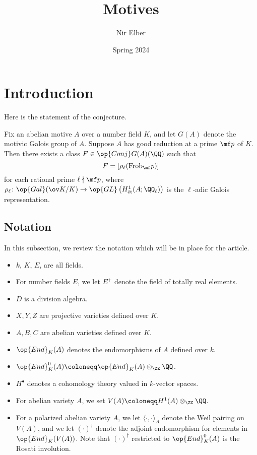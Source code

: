 \documentclass{article}
\title{Motives}
\author{Nir Elber}
\date{Spring 2024}
\begin{document}
\maketitle

\tableofcontents

\section{Introduction}
Here is the statement of the conjecture.
\begin{conj} \label{conj:desired-conjecture}
	Fix an abelian motive $A$ over a number field $K$, and let $G(A)$ denote the motivic Galois group of $A$. Suppose $A$ has good reduction at a prime $\mf p$ of $K$. Then there exists a class $F\in\op{Conj}G(A)(\QQ)$ such that
	\[F=[\rho_\ell(\mathrm{Frob}_\mf p)]\]
	for each rational prime $\ell\nmid\mf p$, where $\rho_\ell\colon\op{Gal}(\ov K/K)\to\op{GL}\left(H^1_{\mathrm{\acute et}}(A;\QQ_\ell)\right)$ is the $\ell$-adic Galois representation.
\end{conj}

\subsection{Notation}
In this subsection, we review the notation which will be in place for the article.
\begin{itemize}
	\item $k$, $K$, $E$, are all fields.
	\item For number fields $E$, we let $E^+$ denote the field of totally real elements.
	\item $D$ is a division algebra.
	\item $X,Y,Z$ are projective varieties defined over $K$.
	\item $A,B,C$ are abelian varieties defined over $K$.
	\item $\op{End}_K(A)$ denotes the endomorphisms of $A$ defined over $k$.
	\item $\op{End}_K^0(A)\coloneqq\op{End}_K(A)\otimes_\ZZ\QQ$.
	\item $H^\bullet$ denotes a cohomology theory valued in $k$-vector spaces.
	\item For abelian variety $A$, we set $V(A)\coloneqq H^1(A)\otimes_\ZZ\QQ$.
	\item For a polarized abelian variety $A$, we let $\langle\cdot,\cdot\rangle_A$ denote the Weil pairing on $V(A)$, and we let $(\cdot)^\dagger$ denote the adjoint endomorphism for elements in $\op{End}_K(V(A))$. Note that $(\cdot)^\dagger$ restricted to $\op{End}_K^0(A)$ is the Rosati involution.
\end{itemize}
\end{document}
